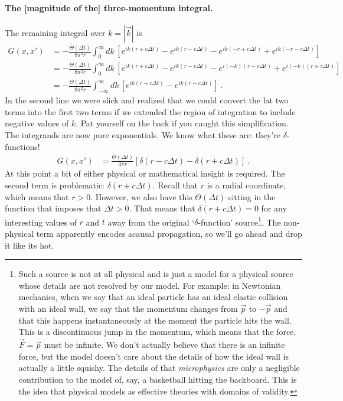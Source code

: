 \paragraph{The [magnitude of the] three-momentum integral.} The remaining integral over $k=|\vec k|$ is
\begin{align}
	G(x,x')&= -
	\frac{\Theta(\Delta t)}{8\pi^2 r} 
	\int^\infty_0
	dk\, 
	\left[
 		e^{ik(r+c\Delta t)}
 		- e^{ik(r-c\Delta t)}
 		- e^{ik(-r+c\Delta t)}
 		+ e^{ik(-r-c\Delta t)}
	\right] 
	\\
	&= -
	\frac{\Theta(\Delta t)}{8\pi^2 r} 
	\int^\infty_0
	dk\, 
	\left[
 		e^{ik(r+c\Delta t)}
 		- e^{ik(r-c\Delta t)}
 		- e^{i(-k)(r-c\Delta t)}
 		+ e^{i(-k)(r+c\Delta t)}
	\right] 
	\\
	&= -
	\frac{\Theta(\Delta t)}{8\pi^2 r} 
	\int^\infty_{-\infty}
	dk\, 
	\left[
 		e^{ik(r+c\Delta t)}
 		- e^{ik(r-c\Delta t)}
	\right] 
	\ .
\end{align}
In the second line we were slick and realized that we could convert the lat two terms into the first two terms if we extended the region of integration to include negative values of $k$. Pat yourself on the back if you caught this simplification. The integrands are now pure exponentials. We know what these are: they're $\delta$-functions!
\begin{align}
	G(x,x')
	&=
	\frac{\Theta(\Delta t)}{4\pi r} 
	\left[ \delta(r-c\Delta t) - \delta(r+c\Delta t) \right]
	\ .
\end{align}
At this point a bit of either physical or mathematical insight is required. The second term is problematic: $\delta(r+c\Delta t)$. Recall that $r$ is a radial coordinate, which means that $r>0$. However, we also have this $\Theta(\Delta t)$ sitting in the function that imposes that $\Delta t > 0$. That means that $\delta(r+c\Delta t) = 0$ for any interesting values of $r$ and $t$ away from the original `$\delta$-function' source\footnote{Such a source is not at all physical and is just a model for a physical source whose details are not resolved by our model. For example: in Newtonian mechanics, when we say that an ideal particle has an ideal elastic collision with an ideal wall, we say that the momentum changes from $\vec{p}$ to $-\vec{p}$ and that this happens instantaneously at the moment the particle hits the wall. This is a discontinuous jump in the momentum, which means that the force, $\vec{F} = \dot{\vec{p}}$ must be infinite. We don't actually believe that there is an infinite force, but the model doesn't care about the details of how the ideal wall is actually a little squishy. The details of that \emph{microphysics} are only a negligible contribution to the model of, say, a basketball hitting the backboard. This is the idea that physical models as effective theories with domains of validity.}. The non-physical term apparently encodes acausal propagation, so we'll go ahead and drop it like its hot.


